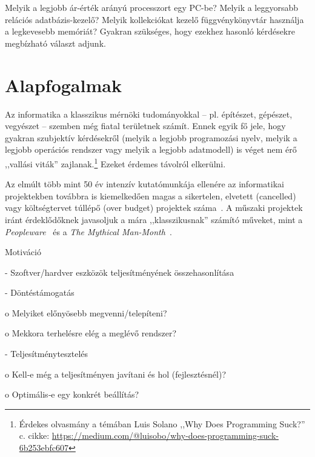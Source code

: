 \label{cha:benchmarking}

\graphicspath{ {./benchmarking/figures/} }

Melyik a legjobb ár-érték arányú processzort egy PC-be? Melyik a leggyorsabb relációs adatbázis-kezelő? Melyik kollekciókat kezelő függvénykönyvtár használja a legkevesebb memóriát? Gyakran szükséges, hogy ezekhez hasonló kérdésekre megbízható választ adjunk.

\section{Alapfogalmak}

\begin{megjegyzes}
	Az informatika a klasszikus mérnöki tudományokkal -- pl. építészet, gépészet, vegyészet -- szemben még fiatal területnek számít. Ennek egyik fő jele, hogy gyakran szubjektív kérdésekről (melyik a legjobb programozási nyelv, melyik a legjobb operációs rendszer vagy melyik a legjobb adatmodell) is véget nem érő ,,vallási viták'' zajlanak.\footnote{Érdekes olvasmány a témában Luis Solano ,,Why Does Programming Suck?'' c. cikke: \url{https://medium.com/@luisobo/why-does-programming-suck-6b253ebfc607}} Ezeket érdemes távolról elkerülni.
	
	Az elmúlt több mint 50 év intenzív kutatómunkája ellenére az informatikai projektekben továbbra is kiemelkedően magas a sikertelen, elvetett (cancelled) vagy költségtervet túllépő (over budget) projektek száma~\cite{HBR:ITProjects}. A műszaki projektek iránt érdeklődőknek javasoljuk a mára ,,klasszikusnak'' számító műveket, mint a \emph{Peopleware}~\cite{demarco2013peopleware} és a \emph{The Mythical Man-Month}~\cite{brooks1995mythical}.
	
\end{megjegyzes}

Motiváció

- Szoftver/hardver eszközök teljesítményének összehasonlítása

- Döntéstámogatás 

o Melyiket előnyösebb megvenni/telepíteni?

o Mekkora terhelésre elég a meglévő rendszer?

- Teljesítménytesztelés 

o Kell‐e még a teljesítményen javítani és hol 
(fejlesztésnél)?

o Optimális‐e egy konkrét beállítás?

